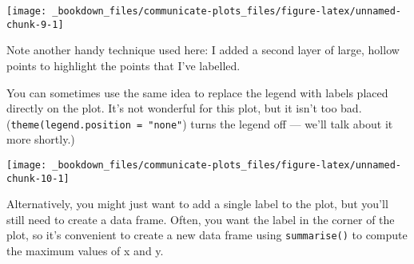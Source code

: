 \documentclass[]{book}
\newenvironment{Shaded}{\begin{snugshade}}{\end{snugshade}}
\newcommand{\KeywordTok}[1]{\textcolor[rgb]{0.13,0.29,0.53}{\textbf{{#1}}}}
\newcommand{\DataTypeTok}[1]{\textcolor[rgb]{0.13,0.29,0.53}{{#1}}}
\newcommand{\DecValTok}[1]{\textcolor[rgb]{0.00,0.00,0.81}{{#1}}}
\newcommand{\StringTok}[1]{\textcolor[rgb]{0.31,0.60,0.02}{{#1}}}
\newcommand{\OtherTok}[1]{\textcolor[rgb]{0.56,0.35,0.01}{{#1}}}
\newcommand{\NormalTok}[1]{{#1}}
\begin{document}
\begin{center}\texttt{[image: \_bookdown\_files/communicate-plots\_files/figure-latex/unnamed-chunk-9-1]} \end{center}

Note another handy technique used here: I added a second layer of large,
hollow points to highlight the points that I've labelled.

You can sometimes use the same idea to replace the legend with labels
placed directly on the plot. It's not wonderful for this plot, but it
isn't too bad. (\texttt{theme(legend.position\ =\ "none"}) turns the
legend off --- we'll talk about it more shortly.)

\begin{Shaded}
\end{Shaded}

\begin{center}\texttt{[image: \_bookdown\_files/communicate-plots\_files/figure-latex/unnamed-chunk-10-1]} \end{center}

Alternatively, you might just want to add a single label to the plot,
but you'll still need to create a data frame. Often, you want the label
in the corner of the plot, so it's convenient to create a new data frame
using \texttt{summarise()} to compute the maximum values of x and y.
\end{document}
